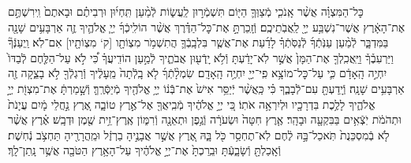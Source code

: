 \documentclass[twoside, openany, parskip=half, 11pt]{book}
\begin{document}
\begin{sometimes}
\begin{footnotesize}
\begin{multicols}{2}
כׇּל־הַמִּצְוָ֗ה אֲשֶׁ֨ר אָֽנֹכִ֧י מְֿצַוְּךָ֛ הַיּ֖וֹם תִּשְׁמְֿר֣וּן לַֽעֲשׂ֑וֹת לְֿמַ֨עַן תִּֽחְי֜וּן וּרְבִיתֶ֗ם וּבָאתֶם֙ וִֽירִשְׁתֶּ֣ם אֶת־הָאָ֔רֶץ אֲשֶׁר־נִשְׁבַּ֥ע יְיָ֖ לַֽאֲבֹֽתֵיכֶֽם׃ וְֿזָֽכַרְתָּ֣ אֶת־כׇּל־הַדֶּ֗רֶךְ אֲשֶׁ֨ר הוֹלִֽיכְֿךָ֜ יְיָ֧ אֱלֹהֶ֛יךָ זֶ֛ה אַרְבָּעִ֥ים שָׁנָ֖ה בַּמִּדְבָּ֑ר לְֿמַ֨עַן עַנֹּֽתְֿךָ֜ לְֿנַסֹּֽתְֿךָ֗ לָדַ֜עַת אֶת־אֲשֶׁ֧ר בִּלְבָֽבְֿךָ֛ הֲתִשְׁמֹ֥ר מִצְוֹתָ֖ו [ק‘ מִצְוֹתָ֖יו] אִם־לֹֽא׃ וַֽיְעַנְּֿךָ֘ וַיַּרְעִבֶ֒ךָ֒ וַיַּֽאֲכִֽלְךָ֤ אֶת־הַמָּן֙ אֲשֶׁ֣ר לֹֽא־יָדַ֔עְתָּ וְֿלֹ֥א יָֽדְֿע֖וּן אֲבֹתֶ֑יךָ לְֿמַ֣עַן הוֹדִֽיעֲךָ֗ כִּ֠י לֹ֣א עַל־הַלֶּ֤חֶם לְֿבַדּוֹ֙ יִחְיֶ֣ה הָֽאָדָ֔ם כִּ֛י עַל־כׇּל־מוֹצָ֥א פִֽי־יְיָ֖ יִחְיֶ֥ה הָֽאָדָֽם׃  שִׂמְלָ֨תְֿךָ֜ לֹ֤א בָֽלְֿתָה֙ מֵֽעָלֶ֔יךָ וְֿרַגְלְֿךָ֖ לֹ֣א בָצֵ֑קָה זֶ֖ה אַרְבָּעִ֥ים שָׁנָֽה׃ וְֿיָֽדַעְתָּ֖ עִם־לְֿבָבֶ֑ךָ כִּ֗י כַּֽאֲשֶׁ֨ר יְֿיַסֵּ֥ר אִישׁ֙ אֶת־בְּֿֿנ֔וֹ יְיָ֥ אֱלֹהֶ֖יךָ מְֿיַסְּֿרֶֽךָּ׃ וְֿשָׁ֣מַרְתָּ֔ אֶת־מִצְוֹ֖ת יְיָ֣ אֱלֹהֶ֑יךָ לָלֶ֥כֶת בִּדְרָכָ֖יו וּלְיִרְאָ֥ה אֹתֽוֹ׃ כִּ֚י יְיָ֣ אֱלֹהֶ֔יךָ מְֿבִֽיאֲךָ֖ אֶל־אֶ֣רֶץ טוֹבָ֑ה אֶ֚רֶץ נַ֣חֲלֵי מָ֔יִם עֲיָנֹת֙ וּתְהֹמֹ֔ת יֹֽצְֿאִ֥ים בַּבִּקְעָ֖ה וּבָהָֽר׃ אֶ֤רֶץ חִטָּה֙ וּשְׂעֹרָ֔ה וְֿגֶ֥פֶן וּתְאֵנָ֖ה וְֿרִמּ֑וֹן אֶֽרֶץ־זֵ֥ית שֶׁ֖מֶן וּדְבָֽשׁ׃ אֶ֗רֶץ אֲשֶׁ֨ר לֹ֤א בְֿמִסְכֵּנֻת֙ תֹּֽאכַל־בָּ֣הּ לֶ֔חֶם לֹֽא־תֶחְסַ֥ר כֹּ֖ל בָּ֑הּ אֶ֚רֶץ אֲשֶׁ֣ר אֲבָנֶ֣יהָ בַרְזֶ֔ל וּמֵֽהֲרָרֶ֖יהָ תַּחְצֹ֥ב נְֿחֽשֶׁת׃ וְֿאָֽכַלְתָּ֖ וְֿשָׂבָ֑עְֿתָּ וּבֵֽרַכְתָּ֙ אֶת־יְיָ֣ אֱלֹהֶ֔יךָ עַל־הָאָ֥רֶץ הַטֹּבָ֖ה אֲשֶׁ֥ר נָֽתַן־לָֽךְ׃


\end{multicols}
\end{footnotesize}
\end{sometimes}
\end{document}
